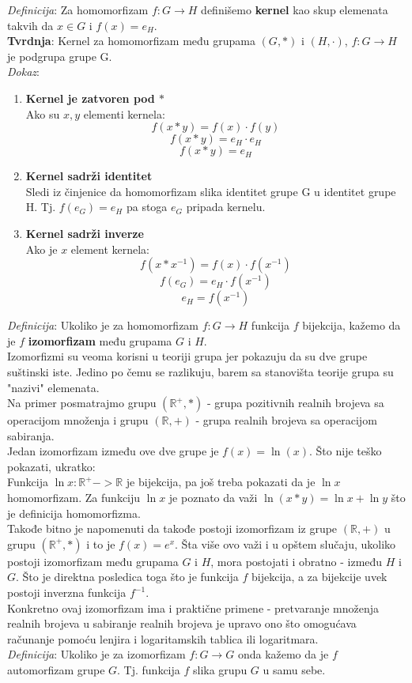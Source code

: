 \documentclass{article}
\begin{document}
\textit{Definicija}: Za homomorfizam $f:G \rightarrow H$ definišemo \textbf{kernel} kao skup elemenata takvih da $x \in G$ i $f(x) = e_H$.\\

\textbf{Tvrdnja}: Kernel za homomorfizam među grupama $(G,*)$ i $(H,\cdot)$, $f:G \rightarrow H$ je podgrupa grupe G.\\

\textit{Dokaz}:
\begin{enumerate}
    \item \textbf{Kernel je zatvoren pod $*$}\\
    Ako su $x,y$ elementi kernela:\\
    $$f(x*y) = f(x) \cdot f(y)$$
    $$f(x*y) = e_H \cdot e_H$$
    $$f(x*y) = e_H$$
    \item \textbf{Kernel sadrži identitet}\\
    Sledi iz činjenice da homomorfizam slika identitet grupe G u identitet grupe H. Tj. $f(e_G) = e_H$ pa stoga $e_G$ pripada kernelu.
    \item \textbf{Kernel sadrži inverze}\\
    Ako je $x$ element kernela:\\
    $$f(x*x^{-1}) = f(x) \cdot f(x^{-1})$$
    $$f(e_G) = e_H \cdot f(x^{-1})$$
    $$e_H = f(x^{-1})$$
\end{enumerate}

\textit{Definicija}: Ukoliko je za homomorfizam $f:G \rightarrow H$ funkcija $f$ bijekcija, kažemo da je $f$ \textbf{izomorfizam} među grupama $G$ i $H$.\\

Izomorfizmi su veoma korisni u teoriji grupa jer pokazuju da su dve grupe suštinski iste. Jedino po čemu se razlikuju, barem sa stanovišta teorije grupa su "nazivi" elemenata.\\
Na primer posmatrajmo grupu $(\mathbb{R}^{+},*)$ - grupa pozitivnih realnih brojeva sa operacijom množenja i grupu $(\mathbb{R},+)$ - grupa realnih brojeva sa operacijom sabiranja.\\
Jedan izomorfizam između ove dve grupe je  $f(x) = \ln(x)$. Što nije teško pokazati, ukratko:\\
Funkcija $\ln x: \mathbb{R}^{+} -> \mathbb{R}$ je bijekcija, pa još treba pokazati da je $\ln x$ homomorfizam. Za funkciju $\ln x$ je poznato da važi $\ln(x*y) = \ln x + \ln y$ što je definicija homomorfizma.\\
Takođe bitno je napomenuti da takođe postoji izomorfizam iz grupe $(\mathbb{R},+)$ u grupu $(\mathbb{R}^{+},*)$ i to je $f(x) = e^x$. Šta više ovo važi i u opštem slučaju, ukoliko postoji izomorfizam među grupama $G$ i $H$, mora postojati i obratno - između $H$ i $G$. Što je direktna posledica toga što je funkcija $f$ bijekcija, a za bijekcije uvek postoji inverzna funkcija $f^{-1}$.\\
Konkretno ovaj izomorfizam ima i praktične primene - pretvaranje množenja realnih brojeva u sabiranje realnih brojeva je upravo ono što omogućava računanje pomoću lenjira i logaritamskih tablica ili logaritmara.\\

\textit{Definicija}: Ukoliko je za izomorfizam $f:G \rightarrow G$ onda kažemo da je $f$ automorfizam grupe $G$. Tj. funkcija $f$ slika grupu $G$ u samu sebe.
\end{document}
